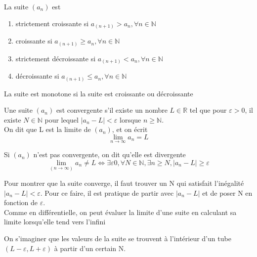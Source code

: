 \documentclass{article}
\begin{document}
\begin{definition}
    La suite $(a_n)$ est
    \begin{enumerate}
	\item strictement croissante si $a_(n+1) > a_n, \forall n \in \mathbb{N}$
	\item croissante si $a_(n+1) \geq a_n, \forall n \in \mathbb{N}$
	\item strictement décroissante si $a_(n+1) < a_n, \forall n \in \mathbb{N}$
	\item décroissante si $a_(n+1) \leq a_n, \forall n \in \mathbb{N}$
    \end{enumerate}
\end{definition}

\begin{definition}
    La suite est monotone si la suite est croissante ou décroissante
\end{definition}

\begin{definition}
    Une suite $(a_n)$ est convergente s'il existe un nombre $L \in \mathbb{R}$
    tel que pour $\varepsilon > 0$, il existe $N \in \mathbb{N}$ pour lequel
    $|a_n - L| < \varepsilon$ lorsque $n \geq \mathbb{N}$.\\
    On dit que L est la limite de $(a_n)$, et on écrit
    $$ \lim_{n \to \infty} a_n = L$$
\end{definition}

\begin{definition}
    Si $(a_n)$ n'est pas convergente, on dit qu'elle est divergente
    $$ \lim_(n \to \infty) a_n \neq L \Longleftrightarrow \exists \varepsilon 0,
    \forall N \in \mathbb{N}, \exists n \geq N, |a_n - L | \geq \varepsilon$$
\end{definition}

\begin{problem}
    Pour montrer que la suite converge, il faut trouver un N qui satisfait
    l'inégalité $|a_n - L| < \varepsilon$. Pour ce faire, il est pratique de
    partir avec $|a_n - L|$ et de poser N en fonction de $\varepsilon$.\\
    Comme en différentielle, on peut évaluer la limite d'une suite en calculant
    sa limite lorsqu'elle tend vers l'infini
\end{problem}

\begin{intuition}
    On s'imaginer que les valeurs de la suite se trouvent à l'intérieur d'un
    tube $(L-\varepsilon, L+\varepsilon)$ à partir d'un certain N.
\end{intuition}
\end{document}
